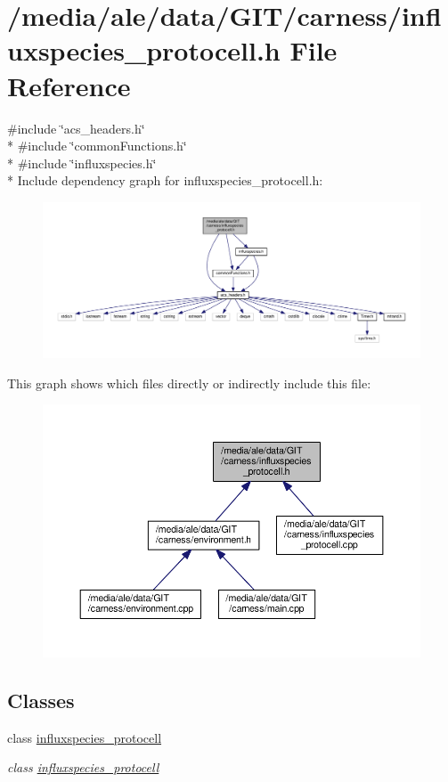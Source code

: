 \hypertarget{a00038}{\section{/media/ale/data/\-G\-I\-T/carness/influxspecies\-\_\-protocell.h File Reference}
\label{a00038}
}
{\ttfamily \#include \char`\"{}acs\-\_\-headers.\-h\char`\"{}}\\*
{\ttfamily \#include \char`\"{}common\-Functions.\-h\char`\"{}}\\*
{\ttfamily \#include \char`\"{}influxspecies.\-h\char`\"{}}\\*
Include dependency graph for influxspecies\-\_\-protocell.\-h\-:\nopagebreak
\begin{figure}[H]
\begin{center}
\leavevmode
\includegraphics[width=350pt]{a00071}
\end{center}
\end{figure}
This graph shows which files directly or indirectly include this file\-:\nopagebreak
\begin{figure}[H]
\begin{center}
\leavevmode
\includegraphics[width=350pt]{a00072}
\end{center}
\end{figure}
\subsection*{Classes}
\begin{DoxyCompactItemize}
\item 
class \hyperlink{a00015}{influxspecies\-\_\-protocell}
\begin{DoxyCompactList}\small\item\em class \hyperlink{a00015}{influxspecies\-\_\-protocell} \end{DoxyCompactList}\end{DoxyCompactItemize}
